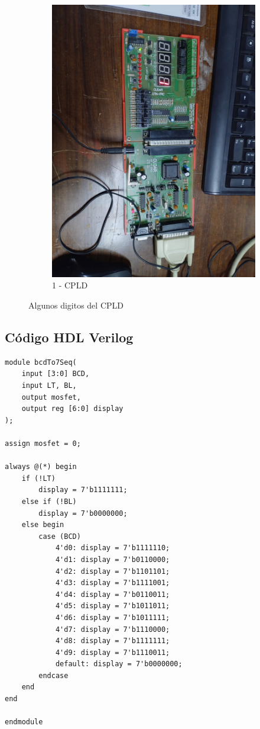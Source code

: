 \begin{center}
\begin{figure}[h!]
\begin{subfigure}[b]{0.45\linewidth}
\includegraphics[width=\linewidth]{./imagenes/1CPLD.jpg}
\caption{1 - CPLD}
\label{fig:westminster_aerea}
\end{subfigure}
\caption{Algunos digitos del CPLD}
\label{fig:westminster}
\end{figure}\end{center}

\subsection{Código HDL Verilog}
\begin{lstlisting}
module bcdTo7Seq(
    input [3:0] BCD,
    input LT, BL,
    output mosfet,
    output reg [6:0] display
);

assign mosfet = 0;

always @(*) begin
    if (!LT)
        display = 7'b1111111;
    else if (!BL)
        display = 7'b0000000;
    else begin
        case (BCD)
            4'd0: display = 7'b1111110;
            4'd1: display = 7'b0110000;
            4'd2: display = 7'b1101101;
            4'd3: display = 7'b1111001;
            4'd4: display = 7'b0110011;
            4'd5: display = 7'b1011011;
            4'd6: display = 7'b1011111;
            4'd7: display = 7'b1110000;
            4'd8: display = 7'b1111111;
            4'd9: display = 7'b1110011;
            default: display = 7'b0000000;
        endcase
    end
end

endmodule
\end{lstlisting}
